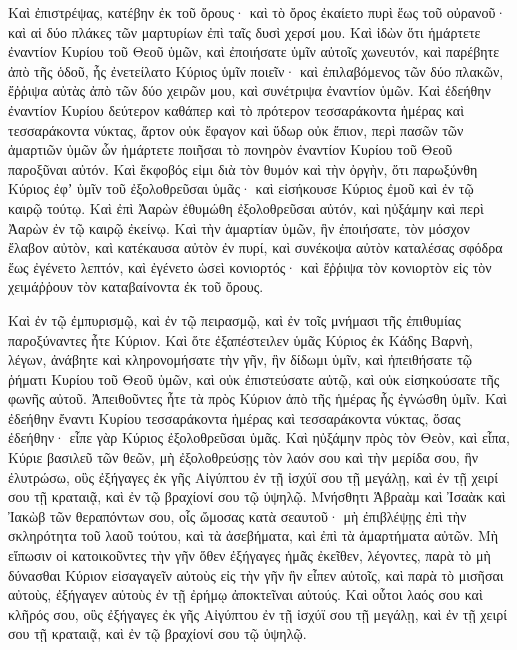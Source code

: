 {Καὶ ἐπιστρέψας, κατέβην ἐκ τοῦ ὄρους· καὶ τὸ ὄρος ἐκαίετο πυρὶ ἕως τοῦ οὐρανοῦ· καὶ αἱ δύο πλάκες τῶν μαρτυρίων ἐπὶ ταῖς δυσὶ χερσί μου.
Καὶ ἰδὼν ὅτι ἡμάρτετε ἐναντίον Κυρίου τοῦ Θεοῦ ὑμῶν, καὶ ἐποιήσατε ὑμῖν αὐτοῖς χωνευτόν, καὶ παρέβητε ἀπὸ τῆς ὁδοῦ, ἧς ἐνετείλατο Κύριος ὑμῖν ποιεῖν·
καὶ ἐπιλαβόμενος τῶν δύο πλακῶν, ἔῤῥιψα αὐτὰς ἀπὸ τῶν δύο χειρῶν μου, καὶ συνέτριψα ἐναντίον ὑμῶν.
Καὶ ἐδεήθην ἐναντίον Κυρίου δεύτερον καθάπερ καὶ τὸ πρότερον τεσσαράκοντα ἡμέρας καὶ τεσσαράκοντα νύκτας, ἄρτον οὐκ ἔφαγον καὶ ὕδωρ οὐκ ἔπιον, περὶ πασῶν τῶν ἁμαρτιῶν ὑμῶν ὧν ἡμάρτετε ποιῆσαι τὸ πονηρὸν ἐναντίον Κυρίου τοῦ Θεοῦ παροξῦναι αὐτόν.
Καὶ ἔκφοβός εἰμι διὰ τὸν θυμόν καὶ τὴν ὀργὴν, ὅτι παρωξύνθη Κύριος ἐφʼ ὑμῖν τοῦ ἐξολοθρεῦσαι ὑμᾶς· καὶ εἰσήκουσε Κύριος ἐμοῦ καὶ ἐν τῷ καιρῷ τούτῳ.
Καὶ ἐπὶ Ἀαρὼν ἐθυμώθη ἐξολοθρεῦσαι αὐτόν, καὶ ηὐξάμην καὶ περὶ Ἀαρὼν ἐν τῷ καιρῷ ἐκείνῳ.
Καὶ τὴν ἁμαρτίαν ὑμῶν, ἣν ἐποιήσατε, τὸν μόσχον ἔλαβον αὐτὸν, καὶ κατέκαυσα αὐτὸν ἐν πυρί, καὶ συνέκοψα αὐτὸν καταλέσας σφόδρα ἕως ἐγένετο λεπτόν, καὶ ἐγένετο ὡσεὶ κονιορτός· καὶ ἔῤῥιψα τὸν κονιορτὸν εἰς τὸν χειμάῤῥουν τὸν καταβαίνοντα ἐκ τοῦ ὄρους.
\par }{\PP {}Καὶ ἐν τῷ ἐμπυρισμῷ, καὶ ἐν τῷ πειρασμῷ, καὶ ἐν τοῖς μνήμασι τῆς ἐπιθυμίας παροξύναντες ἦτε Κύριον.
Καὶ ὅτε ἐξαπέστειλεν ὑμᾶς Κύριος ἐκ Κάδης Βαρνὴ, λέγων, ἀνάβητε καὶ κληρονομήσατε τὴν γῆν, ἣν δίδωμι ὑμῖν, καὶ ἠπειθήσατε τῷ ῥήματι Κυρίου τοῦ Θεοῦ ὑμῶν, καὶ οὐκ ἐπιστεύσατε αὐτῷ, καὶ οὐκ εἰσηκούσατε τῆς φωνῆς αὐτοῦ.
Ἀπειθοῦντες ἦτε τὰ πρὸς Κύριον ἀπὸ τῆς ἡμέρας ἧς ἐγνώσθη ὑμῖν.
Καὶ ἐδεήθην ἔναντι Κυρίου τεσσαράκοντα ἡμέρας καὶ τεσσαράκοντα νύκτας, ὅσας ἐδεήθην· εἶπε γὰρ Κύριος ἐξολοθρεῦσαι ὑμᾶς.
Καὶ ηὐξάμην πρὸς τὸν Θεὸν, καὶ εἶπα, Κύριε βασιλεῦ τῶν θεῶν, μὴ ἐξολοθρεύσῃς τὸν λαόν σου καὶ τὴν μερίδα σου, ἣν ἐλυτρώσω, οὓς ἐξήγαγες ἐκ γῆς Αἰγύπτου ἐν τῇ ἰσχύϊ σου τῇ μεγάλῃ, καὶ ἐν τῇ χειρί σου τῇ κραταιᾷ, καὶ ἐν τῷ βραχίονί σου τῷ ὑψηλῷ.
Μνήσθητι Ἁβραὰμ καὶ Ἰσαὰκ καὶ Ἰακὼβ τῶν θεραπόντων σου, οἷς ὤμοσας κατὰ σεαυτοῦ· μὴ ἐπιβλέψῃς ἐπὶ τὴν σκληρότητα τοῦ λαοῦ τούτου, καὶ τὰ ἀσεβήματα, καὶ ἐπὶ τὰ ἁμαρτήματα αὐτῶν.
Μὴ εἴπωσιν οἱ κατοικοῦντες τὴν γῆν ὅθεν ἐξήγαγες ἡμᾶς ἐκεῖθεν, λέγοντες, παρὰ τὸ μὴ δύνασθαι Κύριον εἰσαγαγεῖν αὐτοὺς εἰς τὴν γῆν ἣν εἶπεν αὐτοῖς, καὶ παρὰ τὸ μισῆσαι αὐτοὺς, ἐξήγαγεν αὐτοὺς ἐν τῇ ἐρήμῳ ἀποκτεῖναι αὐτούς.
Καὶ οὗτοι λαός σου καὶ κλῆρός σου, οὓς ἐξήγαγες ἐκ γῆς Αἰγύπτου ἐν τῇ ἰσχύϊ σου τῇ μεγάλῃ, καὶ ἐν τῇ χειρί σου τῇ κραταιᾷ, καὶ ἐν τῷ βραχίονί σου τῷ ὑψηλῷ.

}
